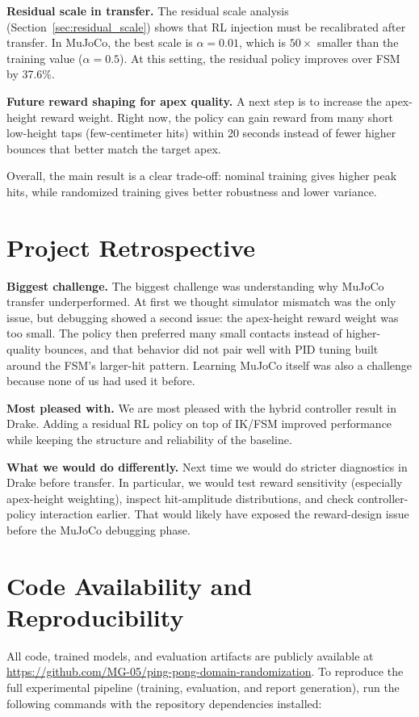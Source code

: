 \documentclass[10pt,twocolumn,letterpaper]{article}
\begin{document}
\textbf{Residual scale in transfer.} The residual scale analysis (Section~\ref{sec:residual_scale}) shows that RL injection must be recalibrated after transfer. In MuJoCo, the best scale is $\alpha = 0.01$, which is $50\times$ smaller than the training value ($\alpha = 0.5$). At this setting, the residual policy improves over FSM by 37.6\%.

\textbf{Future reward shaping for apex quality.} A next step is to increase the apex-height reward weight. Right now, the policy can gain reward from many short low-height taps (few-centimeter hits) within 20 seconds instead of fewer higher bounces that better match the target apex.

Overall, the main result is a clear trade-off: nominal training gives higher peak hits, while randomized training gives better robustness and lower variance.

\section{Project Retrospective}
\textbf{Biggest challenge.}
The biggest challenge was understanding why MuJoCo transfer underperformed. At first we thought simulator mismatch was the only issue, but debugging showed a second issue: the apex-height reward weight was too small. The policy then preferred many small contacts instead of higher-quality bounces, and that behavior did not pair well with PID tuning built around the FSM's larger-hit pattern. Learning MuJoCo itself was also a challenge because none of us had used it before.

\textbf{Most pleased with.}
We are most pleased with the hybrid controller result in Drake. Adding a residual RL policy on top of IK/FSM improved performance while keeping the structure and reliability of the baseline.

\textbf{What we would do differently.}
Next time we would do stricter diagnostics in Drake before transfer. In particular, we would test reward sensitivity (especially apex-height weighting), inspect hit-amplitude distributions, and check controller-policy interaction earlier. That would likely have exposed the reward-design issue before the MuJoCo debugging phase.

\section*{Code Availability and Reproducibility}
All code, trained models, and evaluation artifacts are publicly available at
\url{https://github.com/MG-05/ping-pong-domain-randomization}.
To reproduce the full experimental pipeline (training, evaluation, and report generation), run the following commands with the repository dependencies installed:
\end{document}
